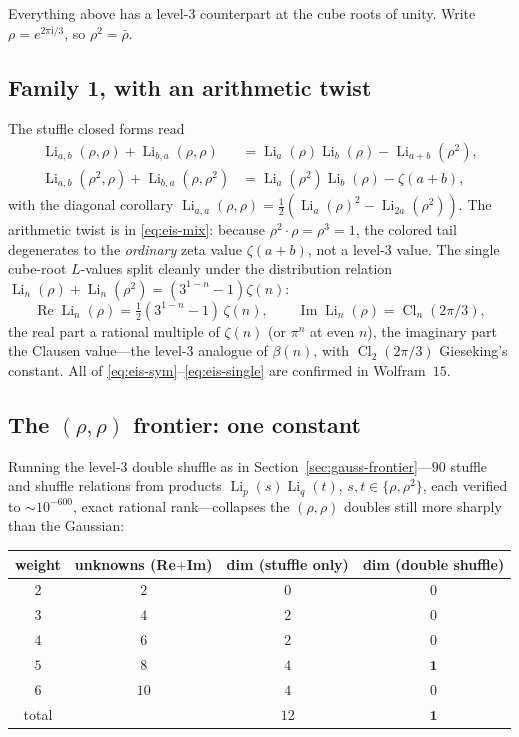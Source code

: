 \documentclass[11pt]{article}
\DeclareMathOperator{\Li}{Li}
\DeclareMathOperator{\Cl}{Cl}
\DeclareMathOperator{\Real}{Re}
\DeclareMathOperator{\Imag}{Im}
\newcommand{\iu}{\mathrm{i}}
\theoremstyle{plain}
\theoremstyle{remark}
\begin{document}
Everything above has a level-$3$ counterpart at the cube roots of unity. Write
$\rho=e^{2\pi\iu/3}$, so $\rho^2=\bar\rho$.

\subsection{Family 1, with an arithmetic twist}

The stuffle closed forms read
\begin{align}
  \Li_{a,b}(\rho,\rho)+\Li_{b,a}(\rho,\rho)     &=\Li_a(\rho)\Li_b(\rho)-\Li_{a+b}(\rho^2),
     \label{eq:eis-sym}\\
  \Li_{a,b}(\rho^2,\rho)+\Li_{b,a}(\rho,\rho^2) &=\Li_a(\rho^2)\Li_b(\rho)-\zeta(a+b),
     \label{eq:eis-mix}
\end{align}
with the diagonal corollary $\Li_{a,a}(\rho,\rho)=\tfrac12(\Li_a(\rho)^2-\Li_{2a}(\rho^2))$. The
arithmetic twist is in \eqref{eq:eis-mix}: because $\rho^2\cdot\rho=\rho^3=1$, the colored tail
degenerates to the \emph{ordinary} zeta value $\zeta(a+b)$, not a level-$3$ value. The single
cube-root $L$-values split cleanly under the distribution relation
$\Li_n(\rho)+\Li_n(\rho^2)=(3^{1-n}-1)\zeta(n)$:
\begin{equation}\label{eq:eis-single}
  \Real\Li_n(\rho)=\tfrac12(3^{1-n}-1)\,\zeta(n),\qquad
  \Imag\Li_n(\rho)=\Cl_n(2\pi/3),
\end{equation}
the real part a rational multiple of $\zeta(n)$ (or $\pi^n$ at even $n$), the imaginary part the
Clausen value---the level-$3$ analogue of $\beta(n)$, with $\Cl_2(2\pi/3)$ Gieseking's constant. All
of \eqref{eq:eis-sym}--\eqref{eq:eis-single} are confirmed in Wolfram~$15$.

\subsection{The $(\rho,\rho)$ frontier: one constant}

Running the level-$3$ double shuffle as in Section~\ref{sec:gauss-frontier}---$90$ stuffle and shuffle
relations from products $\Li_p(s)\Li_q(t)$, $s,t\in\{\rho,\rho^2\}$, each verified to
${\sim}10^{-600}$, exact rational rank---collapses the $(\rho,\rho)$ doubles still more sharply than
the Gaussian:

\begin{center}
\renewcommand{\arraystretch}{1.2}
\begin{tabular}{c c c c}
\hline
weight & unknowns (Re$+$Im) & dim (stuffle only) & dim (double shuffle)\\
\hline
$2$ & $2$  & $0$ & $0$\\
$3$ & $4$  & $2$ & $0$\\
$4$ & $6$  & $2$ & $0$\\
$5$ & $8$  & $4$ & $\mathbf 1$\\
$6$ & $10$ & $4$ & $0$\\
\hline
total & & $12$ & $\mathbf 1$\\
\hline
\end{tabular}
\end{center}
\end{document}

